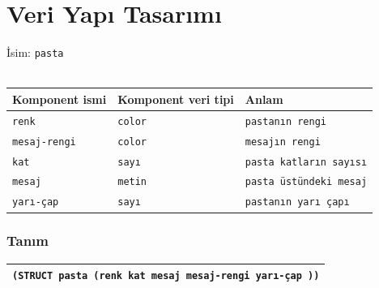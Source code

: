 \documentclass[12pt, a4paper]{article}
\begin{document}
\section*{Veri Yapı Tasarımı}
İsim: \texttt{pasta}\\
\vspace{0.5cm}\\
\begin{tabular}{| p{4cm} | p{4cm} | p{8cm} |  }
\hline			
Komponent ismi&Komponent veri tipi&Anlam\\
\hline
\texttt{renk}&\texttt{color} &\texttt{pastanın rengi}\\[10ex]
\hline  
\texttt{mesaj-rengi}&\texttt{color} &\texttt{mesajın rengi} \\[10ex]
\hline  
\texttt{kat}&\texttt{sayı} &\texttt{pasta katların sayısı} \\[10ex]
\hline  
\texttt{mesaj}&\texttt{metin} &\texttt{pasta üstündeki mesaj} \\[10ex]
\hline  
\texttt{yarı-çap}&\texttt{sayı} &\texttt{pastanın yarı çapı} \\[10ex]
\hline  
\end{tabular}

\subsubsection*{Tanım}
\begin{tabular}{| p{17cm} |  }
\hline			
\vspace{0.5cm}
\texttt{(STRUCT pasta (renk kat mesaj mesaj-rengi yarı-çap ))}\\[10ex]
\hline
\end{tabular}




\newpage
{}
\end{document}
